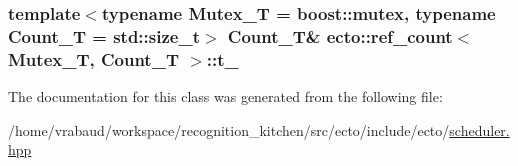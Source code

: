 \subsubsection[{\texorpdfstring{t\+\_\+}{t_}}]{\setlength{\rightskip}{0pt plus 5cm}template$<$typename Mutex\+\_\+T  = boost\+::mutex, typename Count\+\_\+T  = std\+::size\+\_\+t$>$ Count\+\_\+T\& {\bf ecto\+::ref\+\_\+count}$<$ Mutex\+\_\+T, Count\+\_\+T $>$\+::t\+\_\+\hspace{0.3cm}{\ttfamily [private]}}\hypertarget{classecto_1_1ref__count_a689842816509f8f13710aee79b8c9898}{}\label{classecto_1_1ref__count_a689842816509f8f13710aee79b8c9898}


The documentation for this class was generated from the following file\+:\begin{DoxyCompactItemize}
\item 
/home/vrabaud/workspace/recognition\+\_\+kitchen/src/ecto/include/ecto/\hyperlink{scheduler_8hpp}{scheduler.\+hpp}\end{DoxyCompactItemize}
